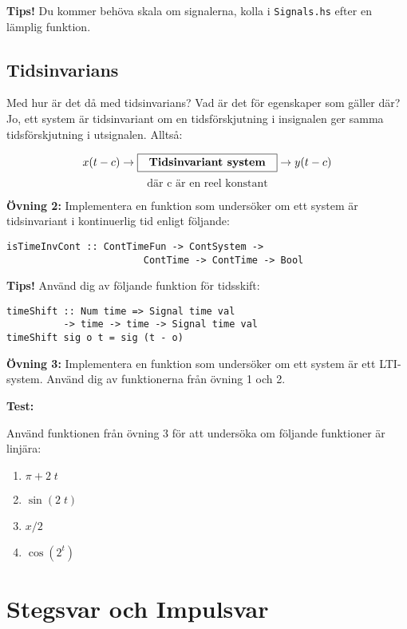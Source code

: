 \documentclass{article}
\begin{document}
\textbf{Tips!} Du kommer behöva skala om signalerna, kolla i {\tt Signals.hs} efter en
lämplig funktion.

\subsection{Tidsinvarians}
Med hur är det då med tidsinvarians? Vad är det för egenskaper som gäller
där? Jo, ett system är tidsinvariant om en tidsförskjutning i insignalen ger samma tidsförskjutning i utsignalen. Alltså:

$$x(t-c) \rightarrow \framebox[1.2\width]{\textbf{Tidsinvariant system}} \rightarrow y(t-c) $$
  $$\mbox{där c är en reel konstant}$$

\textbf{Övning 2:} Implementera en funktion som undersöker om ett system är tidsinvariant i kontinuerlig tid enligt följande:

\begin{verbatim}
isTimeInvCont :: ContTimeFun -> ContSystem ->
                        ContTime -> ContTime -> Bool

\end{verbatim}

\textbf{Tips!} Använd dig av följande funktion för tidsskift:

\begin{verbatim}
timeShift :: Num time => Signal time val
          -> time -> time -> Signal time val
timeShift sig o t = sig (t - o)
\end{verbatim}

\textbf{Övning 3:} Implementera en funktion som undersöker om ett system är ett LTI-system. Använd dig av funktionerna från övning 1 och 2.

\textbf{Test:}


Använd funktionen från övning 3 för att undersöka om följande funktioner är linjära:
\begin{enumerate}
\item $\pi + 2\;t$
\item $\sin(2\;t)$
\item $x/2$
\item $\cos(2^t)$
\end{enumerate}

\section{Stegsvar och Impulsvar}
\end{document}
